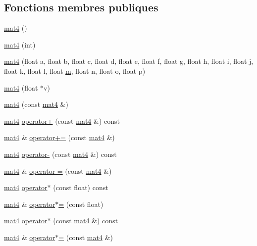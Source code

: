 \subsection*{Fonctions membres publiques}
\begin{DoxyCompactItemize}
\item 
\hyperlink{structmat4_acf3f0c37ff5c16e8fb1bfdde2bf87a0f}{mat4} ()
\item 
\hyperlink{structmat4_abbb345d8e90b7f5520a2854e4d171fad}{mat4} (int)
\item 
\hyperlink{structmat4_a9064945e550426ca0cbdc783abc159e3}{mat4} (float a, float b, float c, float d, float e, float f, float g, float h, float i, float j, float k, float l, float \hyperlink{structmat4_ab424bc8677a83f16bd30f4eaaecb6d3a}{m}, float n, float o, float p)
\item 
\hyperlink{structmat4_af9f2c48595cc3ef77b7264b6e1b80a9f}{mat4} (float $\ast$v)
\item 
\hyperlink{structmat4_a073e199b47525502781e3c36ef032dfb}{mat4} (const \hyperlink{structmat4}{mat4} \&)
\item 
\hyperlink{structmat4}{mat4} \hyperlink{structmat4_a1e09ab23f48d22eacf7480be5a6cea87}{operator+} (const \hyperlink{structmat4}{mat4} \&) const 
\item 
\hyperlink{structmat4}{mat4} \& \hyperlink{structmat4_a350e999ece6a2de198453342051887d5}{operator+=} (const \hyperlink{structmat4}{mat4} \&)
\item 
\hyperlink{structmat4}{mat4} \hyperlink{structmat4_a2ad7a60d812142642531b0ac06bf1c8e}{operator-\/} (const \hyperlink{structmat4}{mat4} \&) const 
\item 
\hyperlink{structmat4}{mat4} \& \hyperlink{structmat4_ac132dfe2e95f489dbd7164d91b535d7b}{operator-\/=} (const \hyperlink{structmat4}{mat4} \&)
\item 
\hyperlink{structmat4}{mat4} \hyperlink{structmat4_adfe86534dfda83be41334feaff6a9584}{operator$\ast$} (const float) const 
\item 
\hyperlink{structmat4}{mat4} \& \hyperlink{structmat4_ad0826521db3c90c1b3aba01c0e36d26e}{operator$\ast$=} (const float)
\item 
\hyperlink{structmat4}{mat4} \hyperlink{structmat4_a7cabd070852d9ccb840b20a6e4e492c2}{operator$\ast$} (const \hyperlink{structmat4}{mat4} \&) const 
\item 
\hyperlink{structmat4}{mat4} \& \hyperlink{structmat4_a480d75ddc6c5b4cd52f96eb9bde7966a}{operator$\ast$=} (const \hyperlink{structmat4}{mat4} \&)
\item 

\end{DoxyCompactItemize}
